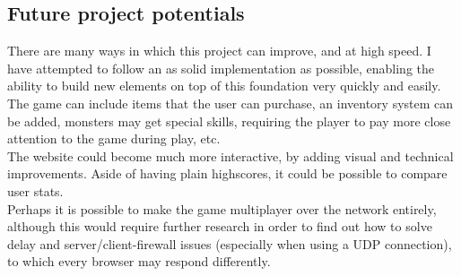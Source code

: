\documentclass[12pt]{report}
\begin{document}
\subsection*{Future project potentials}
There are many ways in which this project can improve, and at high speed. I have attempted to follow an as solid implementation as possible, enabling the ability to build new elements on top of this foundation very quickly and easily.\\
The game can include items that the user can purchase, an inventory system can be added, monsters may get special skills, requiring the player to pay more close attention to the game during play, etc.\\
The website could become much more interactive, by adding visual and technical improvements. Aside of having plain highscores, it could be possible to compare user stats.\\
Perhaps it is possible to make the game multiplayer over the network entirely, although this would require further research in order to find out how to solve delay and server/client-firewall issues (especially when using a UDP connection), to which every browser may respond differently.
\end{document}
